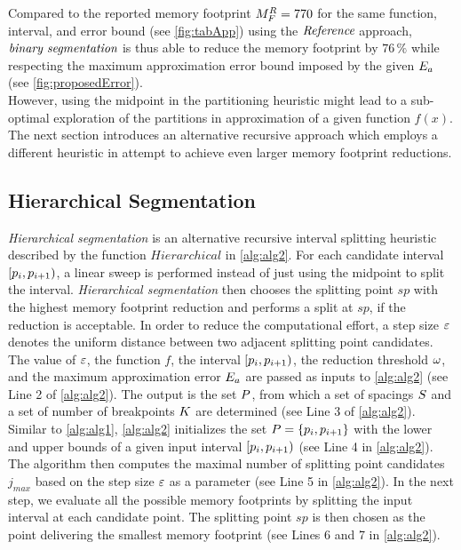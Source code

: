 Compared to the reported memory footprint $M_{F}^R=770$ for the same function, interval, and error bound (see \cref{fig:tabApp}) using the $\textit{Reference}$ approach, $\textit{binary segmentation}$ is thus able to reduce the memory footprint by $76\,\%$ while respecting the maximum approximation error bound imposed by the given $E_a$ (see \cref{fig:proposedError}).\\
However, using the midpoint in the partitioning heuristic might lead to a sub-optimal exploration of the partitions in approximation of a given function $f(x)$. The next section introduces an alternative recursive approach which employs a different heuristic in attempt to achieve even larger memory footprint reductions.
\subsection{Hierarchical Segmentation}\label{hier_seg}
\textit{Hierarchical segmentation} is an alternative recursive interval splitting heuristic described by the function $Hierarchical$ in \cref{alg:alg2}. 
For each candidate interval $[p_{i},p_{i+1})$, a linear sweep is performed instead of just using the midpoint to split the interval.
\textit{Hierarchical segmentation} then chooses the splitting point $sp$ with the highest memory footprint reduction and performs a split at $sp$, if the reduction is acceptable.
In order to reduce the computational effort, a step size $\varepsilon$ denotes the uniform distance between two adjacent splitting point candidates.
The value of $\varepsilon$, the function $f$, the interval $[p_{i},p_{i+1})$, the reduction threshold $\omega$, and the maximum approximation error $E_a$ are passed as inputs to \cref{alg:alg2} (see Line 2 of \cref{alg:alg2}).
The output is the set $P$, from which a set of spacings $S$ and a set of number of breakpoints $K$ are determined (see Line 3 of \cref{alg:alg2}).\\
Similar to \cref{alg:alg1}, \cref{alg:alg2} initializes the set $P=\{p_{i},p_{i+1}\}$ with the lower and upper bounds of a given input interval $[p_{i},p_{i+1})$ (see Line 4 in \cref{alg:alg2}).
The algorithm then computes the maximal number of splitting point candidates $j_{max}$ based on the step size $\varepsilon$ as a parameter (see Line 5 in \cref{alg:alg2}). 
In the next step, we evaluate all the possible memory footprints by splitting the input interval at each candidate point. 
The splitting point $sp$ is then chosen as the point delivering the smallest memory footprint (see Lines 6 and 7 in \cref{alg:alg2}).
